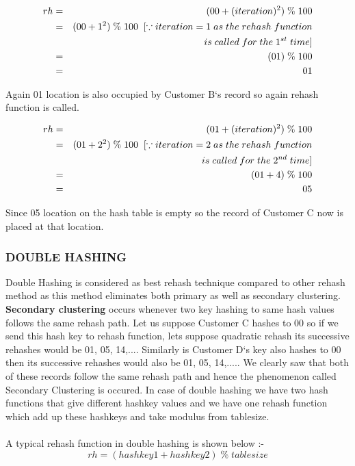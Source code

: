 \documentclass[12pt,a4paper]{article}
\begin{document}
\begin{eqnarray*}
rh&=&(00 + (iteration)^2)\;\%\;100 \\
&=&(00 + 1^2)\;\%\;100\;\;[\because iteration = 1\;as\;the\; rehash\;function\\ &&\hspace{32mm}is\;called\;for\;the\;1^{st}\;time]\\
&=&(01)\;\%\;100 \\
&=&01 \\
\end{eqnarray*}

\noindent Again 01 location is also occupied by Customer B`s record so again rehash function is called.

\begin{eqnarray*}
rh&=&(01 + (iteration)^2)\;\%\;100 \\
&=&(01 + 2^2)\;\%\;100\;\;[\because iteration = 2\;as\;the\; rehash\;function\\ &&\hspace{32mm}is\;called\;for\;the\;2^{nd}\;time]\\
&=&(01 + 4)\;\%\;100 \\
&=&05 \\
\end{eqnarray*}

\noindent Since 05 location on the hash table is empty so the record of Customer C now is placed at that location.

\subsubsection{DOUBLE HASHING}
Double Hashing is considered as best rehash technique compared to other rehash method as this method eliminates both primary as well as secondary clustering. \textbf{Secondary clustering} occurs whenever two key hashing to same hash values follows the same rehash path. Let us suppose Customer C hashes to 00 so if we send this hash key to rehash function, lets suppose quadratic rehash its successive rehashes would be 01, 05, 14,.... Similarly is Customer D`s key also hashes to 00 then its successive rehashes would also be 01, 05, 14,..... We clearly saw that both of these records follow the same rehash path and hence the phenomenon called Secondary Clustering is occured. In case of double hashing we have two hash functions that give different hashkey values and we have one rehash function which add up these hashkeys and take modulus from tablesize. \\ \\
A typical rehash function in double hashing is shown below :-
$$rh = (hashkey1 + hashkey2) \;\%\; tablesize$$
\end{document}
